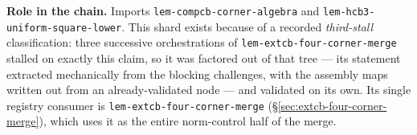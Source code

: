 \noindent\textbf{Role in the chain.} Imports \texttt{lem-compcb-corner-algebra} and
\texttt{lem-hcb3-uniform-square-lower}. This shard exists because of a recorded
\emph{third-stall} classification: three successive orchestrations of
\texttt{lem-extcb-four-corner-merge} stalled on exactly this claim, so it was factored out
of that tree --- its statement extracted mechanically from the blocking challenges, with
the assembly maps written out from an already-validated node --- and validated on its own.
Its single registry consumer is \texttt{lem-extcb-four-corner-merge}
(\S\ref{sec:extcb-four-corner-merge}), which uses it as the entire norm-control half of
the merge.
